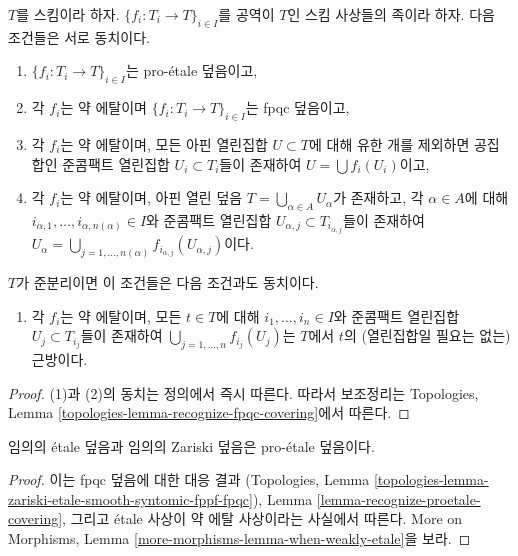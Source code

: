 \begin{lemma}
\label{lemma-recognize-proetale-covering}
$T$를 스킴이라 하자. $\{f_i : T_i \to T\}_{i \in I}$를 공역이 $T$인
스킴 사상들의 족이라 하자. 다음 조건들은 서로 동치이다.
\sloppy
\begin{enumerate}
\item $\{f_i : T_i \to T\}_{i \in I}$는 pro-\'etale 덮음이고,
\item 각 $f_i$는 약 에탈이며 $\{f_i : T_i \to T\}_{i \in I}$는
fpqc 덮음이고,
\item 각 $f_i$는 약 에탈이며, 모든 아핀 열린집합 $U \subset T$에 대해
유한 개를 제외하면 공집합인 준콤팩트 열린집합 $U_i \subset T_i$들이
존재하여 $U = \bigcup f_i(U_i)$이고,
\item 각 $f_i$는 약 에탈이며, 아핀 열린 덮음
$T = \bigcup_{\alpha \in A} U_\alpha$가 존재하고, 각 $\alpha \in A$에 대해
$i_{\alpha, 1}, \ldots, i_{\alpha, n(\alpha)} \in I$와 준콤팩트 열린집합
$U_{\alpha, j} \subset T_{i_{\alpha, j}}$들이 존재하여
$U_\alpha =
\bigcup_{j = 1, \ldots, n(\alpha)} f_{i_{\alpha, j}}(U_{\alpha, j})$이다.
\end{enumerate}
\fussy
$T$가 준분리이면 이 조건들은 다음 조건과도 동치이다.
\begin{enumerate}
\item[(5)] 각 $f_i$는 약 에탈이며, 모든 $t \in T$에 대해
$i_1, \ldots, i_n \in I$와 준콤팩트 열린집합 $U_j \subset T_{i_j}$들이
존재하여 $\bigcup_{j = 1, \ldots, n} f_{i_j}(U_j)$는 $T$에서 $t$의
(열린집합일 필요는 없는) 근방이다.
\end{enumerate}
\end{lemma}

\begin{proof}
(1)과 (2)의 동치는 정의에서 즉시 따른다. 따라서 보조정리는
Topologies, Lemma \ref{topologies-lemma-recognize-fpqc-covering}에서 따른다.
\end{proof}

\begin{lemma}
\label{lemma-etale-proetale}
임의의 \'etale 덮음과 임의의 Zariski 덮음은 pro-\'etale 덮음이다.
\end{lemma}

\begin{proof}
이는 fpqc 덮음에 대한 대응 결과
(Topologies, Lemma
\ref{topologies-lemma-zariski-etale-smooth-syntomic-fppf-fpqc}),
Lemma \ref{lemma-recognize-proetale-covering}, 그리고 \'etale 사상이
약 에탈 사상이라는 사실에서 따른다. More on Morphisms, Lemma
\ref{more-morphisms-lemma-when-weakly-etale}을 보라.
\end{proof}

